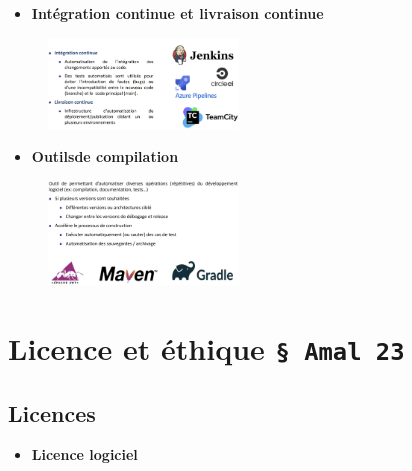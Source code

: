 \documentclass[16pt]{report}
\begin{document}
\begin{multicols*}{2}
    \begin{itemize}
        \item \textbf{Intégration continue et livraison continue}  
    \end{itemize}


     \begin{figure}[H]
        \begin{center}
            \includegraphics[width=0.45\textwidth]{integration.png}
        \end{center}
    \end{figure}


    \begin{itemize}
        \item \textbf{Outilsde compilation}  
    \end{itemize}
       

     \begin{figure}[H]
        \begin{center}
            \includegraphics[width=0.45\textwidth]{integration2.png}
        \end{center}
    \end{figure}



    \chapter{Licence et éthique \texttt{\S \; Amal 23 }  }

    \section{Licences}


    \begin{itemize}
        \item \textbf{Licence logiciel}
    \end{itemize}



\end{multicols*}
\end{document}
